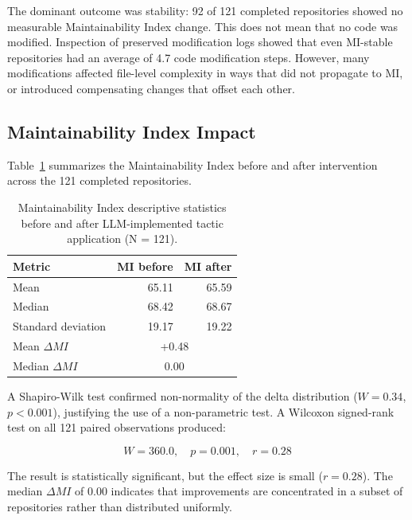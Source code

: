 The dominant outcome was stability: 92 of 121 completed repositories showed no measurable Maintainability Index change. This does not mean that no code was modified. Inspection of preserved modification logs showed that even MI-stable repositories had an average of 4.7 code modification steps. However, many modifications affected file-level complexity in ways that did not propagate to MI, or introduced compensating changes that offset each other.

\subsection{Maintainability Index Impact}
\label{subsec:eval_mi_impact}

Table~\ref{tab:eval_mi_descriptive} summarizes the Maintainability Index before and after intervention across the 121 completed repositories.

\begin{table}[H]
\centering
\small
\caption{Maintainability Index descriptive statistics before and after LLM-implemented tactic application (N = 121).}
\label{tab:eval_mi_descriptive}
\begin{tabular}{lrr}
\toprule
\textbf{Metric} & \textbf{MI before} & \textbf{MI after} \\
\midrule
Mean & 65.11 & 65.59 \\
Median & 68.42 & 68.67 \\
Standard deviation & 19.17 & 19.22 \\
\midrule
Mean $\Delta MI$ & \multicolumn{2}{c}{+0.48} \\
Median $\Delta MI$ & \multicolumn{2}{c}{0.00} \\
\bottomrule
\end{tabular}
\end{table}

A Shapiro-Wilk test confirmed non-normality of the delta distribution ($W = 0.34$, $p < 0.001$), justifying the use of a non-parametric test. A Wilcoxon signed-rank test on all 121 paired observations produced:

\begin{equation}
W = 360.0,\quad p = 0.001,\quad r = 0.28
\end{equation}

The result is statistically significant, but the effect size is small ($r = 0.28$). The median $\Delta MI$ of 0.00 indicates that improvements are concentrated in a subset of repositories rather than distributed uniformly.

